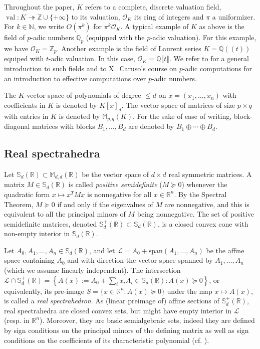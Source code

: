 \documentclass[a4paper,12pt]{article}
\newcommand{\R}{\mathbb{R}} %
\newcommand{\N}{\mathbb{N}} %
\newcommand{\allmat}{\mathbb{M}} %
\newcommand{\sym}{\mathbb{S}} %
\renewcommand{\span}[1]{{\text{span}(#1)}} %
\newcommand{\calL}{\mathcal{L}} %
\DeclareMathOperator{\val}{val}
\def\QQ{\ensuremath{\mathbb{Q}}}
\def\ZZ{\ensuremath{\mathbb{Z}}}
\newcommand{\OK}{\mathcal{O}_K}
\begin{document}
Throughout the paper, $K$ refers to a complete,
discrete valuation field, $\val : K \twoheadrightarrow \ZZ \cup \{+\infty\}$ to its valuation,
$\OK$ its ring of integers and $\pi$ a uniformizer.
For $k \in \N$, we write $O(\pi^k)$ for $\pi^k \OK$.
A typical example of $K$ as above is the field of $p$-adic numbers 
$\QQ_p$ (equipped with the $p$-adic valuation). For this example, we 
have $\OK = \ZZ_p$.
Another example is the field of Laurent series
$K=\QQ(\!(t)\!)$ equiped with $t$-adic valuation.
In this case, $\OK = \QQ \llbracket t \rrbracket$.
We refer to \cite{Serre:1979} for a
general introduction to such fields
and to X.~Caruso's course on $p$-adic computations \cite{caruso_computations_2017}
for an introduction to effective computations over $p$-adic numbers.

The $K$-vector space of polynomials of degree $\leq d$ on $x=(x_1,\ldots,x_n)$
with coefficients in $K$ is denoted by $K[x]_{d}$. The vector space of matrices of
size $p \times q$ with entries in $K$ is denoted by $\allmat_{p,q}(K)$. For the sake
of ease of writing, block-diagonal matrices with blocks $B_1,\ldots,B_d$ are denoted by
$B_1 \oplus \cdots \oplus B_d$.

\subsection{Real spectrahedra}

Let $\sym_d(\R) \subset \allmat_{d,d}(\R)$ be the vector space of $d \times d$ real symmetric
matrices. A matrix $M \in \sym_d(\R)$
is called \emph{positive semidefinite} ($M \succeq 0$) whenever the quadratic
form $x \mapsto x^TMx$ is nonnegative for all $x\in \R^n$. By the Spectral Theorem, $M \succeq 0$
if and only if the eigenvalues of $M$ are nonnegative, and this is equivalent to all the principal minors
of $M$ being nonnegative. The set of positive semidefinite matrices, denoted $\sym_d^+(\R) \subset \sym_d(\R)$,
is a closed convex cone with non-empty interior in $\sym_d(\R)$.

Let $A_0,A_1,\ldots,A_n \in \sym_d(\R)$, and let $\calL = A_0+\span{A_1,\ldots,A_n}$ be the affine space
containing $A_0$ and with direction the vector space spanned by $A_1,\ldots,A_n$ (which we assume linearly
independent). The intersection $\calL \cap \sym_d^+(\R) = \left\{A(x) := A_0+\sum_i x_i A_i \in \sym_d(\R) :
A(x) \succeq 0\right\}$, or
equivalently, its pre-image $S = \{x \in \R^n : A(x) \succeq 0\}$ under the map $x \mapsto A(x)$, is called
a \emph{real spectrahedron}. As (linear preimage of) affine sections of $\sym_d^+(\R)$, real spectrahedra
are closed convex sets, but might have empty interior in $\calL$ (resp. in $\R^n$).
Moreover, they are basic semialgebraic sets, indeed they are defined by sign conditions on the principal
minors of the defining matrix as well as sign conditions on the coefficients of its characteristic polynomial
(cf. ).
\end{document}
